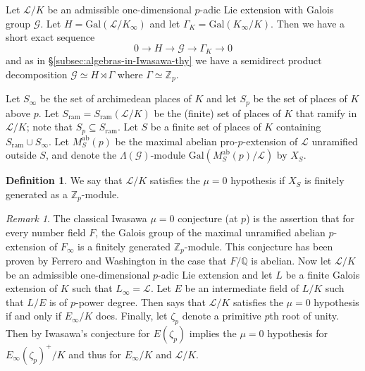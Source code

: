 \documentclass[12pt]{amsart}
\theoremstyle{plain}
\theoremstyle{remark}
\newtheorem{remark}[theorem]{Remark}
\theoremstyle{definition}
\newtheorem{definition}[theorem]{Definition}
\numberwithin{equation}{section}
\begin{document}
Let $\mathcal{L}/K$ be an admissible one-dimensional $p$-adic Lie extension with Galois group $\mathcal{G}$.
Let $H={\mathrm{Gal}}(\mathcal{L}/K_{\infty})$ and let $\Gamma_{K}={\mathrm{Gal}}(K_{\infty}/K)$.
Then we have a short exact sequence
\[
0 \longrightarrow H \longrightarrow \mathcal{G} \longrightarrow \Gamma_{K} \longrightarrow 0
\]
and as in \S \ref{subsec:algebras-in-Iwasawa-thy} we have a semidirect product decomposition
$\mathcal{G} \simeq H \rtimes \Gamma$ where $\Gamma \simeq {\mathbb{Z}}_{p}$.

Let $S_{\infty}$ be the set of archimedean places of $K$ and let $S_{p}$ be the set of places of $K$ above $p$.
Let $S_{\mathrm{ram}}=S_{\mathrm{ram}}(\mathcal{L}/K)$ be the (finite) set of places of $K$ that ramify in $\mathcal{L}/K$;
note that  $S_{p} \subseteq S_{\mathrm{ram}}$.
Let $S$ be a finite set of places of $K$ containing $S_{\mathrm{ram}} \cup S_{\infty}$.
Let $M_{S}^{\mathrm{ab}}(p)$ be the maximal abelian pro-$p$-extension of $\mathcal{L}$ unramified outside $S$,
and denote the $\Lambda(\mathcal{G})$-module ${\mathrm{Gal}}(M_{S}^{\mathrm{ab}}(p)/\mathcal{L})$ by $X_{S}$.

\begin{definition}\label{def:mu=0-hypothesis}
We say that $\mathcal{L}/K$ satisfies the $\mu=0$ hypothesis if $X_{S}$ is finitely generated as a ${\mathbb{Z}}_{p}$-module.
\end{definition}

\begin{remark}\label{rmk:mu=0}
The classical Iwasawa $\mu=0$ conjecture (at $p$) is the assertion that for every number field $F$, the
Galois group of the maximal unramified abelian $p$-extension of $F_{\infty}$ is a finitely generated ${\mathbb{Z}}_{p}$-module.
This conjecture has been proven by Ferrero and Washington \cite{MR528968} in the case that $F/{\mathbb{Q}}$ is abelian.
Now let $\mathcal{L}/K$ be an admissible one-dimensional $p$-adic Lie extension
and let $L$ be a finite Galois extension of $K$ such that $L_{\infty}=\mathcal{L}$.
Let $E$ be an intermediate field of $L/K$ such that $L/E$ is of $p$-power degree.
Then \cite[Theorem 11.3.8]{MR2392026} says that $\mathcal{L}/K$
satisfies the $\mu=0$ hypothesis if and only if $E_{\infty}/K$ does.
Finally, let $\zeta_{p}$ denote a primitive $p$th root of unity.
Then by \cite[Corollary 11.4.4]{MR2392026} Iwasawa's conjecture for $E(\zeta_{p})$ implies the $\mu=0$ hypothesis for 
$E_{\infty}(\zeta_{p})^{+}/K$ and thus for $E_{\infty}/K$ and $\mathcal{L}/K$.
\end{remark}
\end{document}
